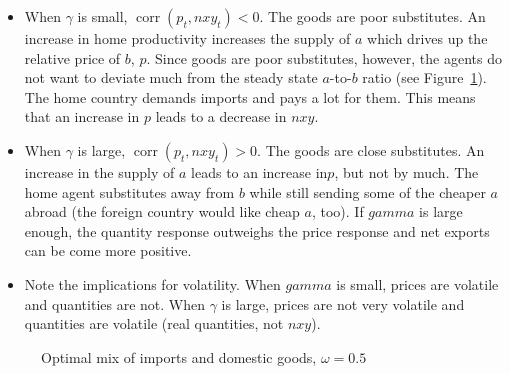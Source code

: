 \documentclass[11pt,pdftex,twoside,letterpaper]{exam}
\DeclareMathOperator{\corr}{\mathrm{corr}}
\begin{document}
\begin{itemize}
\item When $\gamma$ is small, $\corr(p_t,nxy_t)<0$. The goods are poor substitutes. An increase in home productivity increases the supply of $a$ which drives up the relative  price of $b$, $p$. Since goods are poor substitutes, however, the agents do not want to deviate much from the steady state $a$-to-$b$ ratio (see Figure~\ref{fig:optimal-mix}). The home country demands imports and pays a lot for them. This means that an increase in $p$ leads to a decrease in $nxy$.
\item When $\gamma$ is large, $\corr(p_t,nxy_t)>0$. The goods are close substitutes. An increase in the supply of $a$  leads to an increase in$p$, but not by much. The home agent substitutes away from $b$ while still sending some of the cheaper $a$ abroad (the foreign country would like cheap $a$, too). If $gamma$ is large enough, the quantity response outweighs the price response and net exports can be come more positive.
\item Note the implications for volatility. When $gamma$ is small, prices are volatile and quantities are not. When $\gamma$ is large, prices are not very volatile and quantities are volatile (real quantities, not $nxy$).
\end{itemize}
 \begin{figure}[H]
 \centering
 \caption{Optimal mix of imports and domestic goods, $\omega=0.5$} \label{fig:optimal-mix}
    \end{figure}
\end{document}
